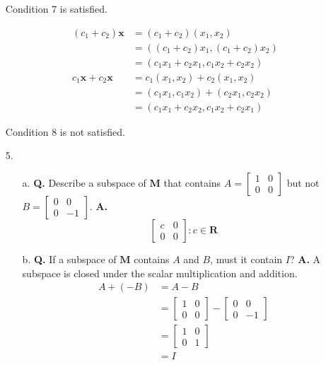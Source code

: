 \documentclass[main.tex]{subfiles}
\begin{document}
\begin{enumerate}
    Condition 7 is satisfied.
    
    $$
    \begin{aligned}
    \left(c_{1}+c_{2}\right) \mathbf{x} &=\left(c_{1}+c_{2}\right)\left(x_{1}, x_{2}\right) \\
    &=\left(\left(c_{1}+c_{2}\right) x_{1},\left(c_{1}+c_{2}\right) x_{2}\right) \\
    &=\left(c_{1} x_{1}+c_{2} x_{1}, c_{1} x_{2}+c_{2} x_{2}\right)\\
    c_{1} \mathbf{x}+c_{2} \mathbf{x} &=c_{1}\left(x_{1}, x_{2}\right)+c_{2}\left(x_{1}, x_{2}\right) \\
    &=\left(c_{1} x_{1}, c_{1} x_{2}\right)+\left(c_{2} x_{1}, c_{2} x_{2}\right) \\
    &=\left(c_{1} x_{1}+c_{2} x_{2}, c_{1} x_{2}+c_{2} x_{1}\right)
    \end{aligned}
    $$

    Condition 8 is not satisfied.

    \item [5.] 
    \begin{enumerate}
        \item [a.] \textbf{Q.} Describe a subspace of $\mathbf{M}$ that contains $A=\left[\begin{array}{ll}1 & 0 \\ 0 & 0\end{array}\right]$ but not $B=\left[\begin{array}{ll}0 & 0 \\ 0 & -1\end{array}\right]$. 
        \textbf{A.}
        $$
        \left[\begin{array}{ll}
        c & 0 \\
        0 & 0
        \end{array}\right]: c \in \mathbf{R}
        $$
        
        \item [b.] \textbf{Q.} If a subspace of $\mathbf{M}$ contains $A$ and $B$, must it contain $I$? 
        \textbf{A.} A subspace is closed under the scalar multiplication and addition.
        $$
        \begin{aligned}
        A+(-B) &=A-B \\
        &=\left[\begin{array}{ll}
        1 & 0 \\
        0 & 0
        \end{array}\right]-\left[\begin{array}{cc}
        0 & 0 \\
        0 & -1
        \end{array}\right] \\
        &=\left[\begin{array}{ll}
        1 & 0 \\
        0 & 1
        \end{array}\right] \\
        &=I
        \end{aligned}
        $$
        

\end{enumerate}
\end{enumerate}
\end{document}
